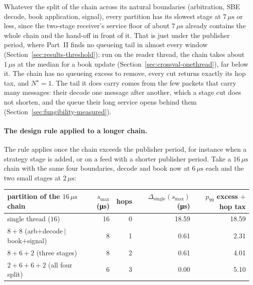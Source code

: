 \documentclass[11pt]{article}
\begin{document}
Whatever the split of the chain across its natural boundaries (arbitration, SBE decode,
book application, signal), every partition has its slowest stage at $7\,\mu\mathrm{s}$ or
less, since the two-stage receiver's service floor of about $7\,\mu\mathrm{s}$ already
contains the whole chain and the hand-off in front of it. That is just under the publisher
period, where Part~II finds no queueing tail in almost every window
(Section~\ref{sec:results-threshold}); run on the reader thread, the chain takes about
$1\,\mu\mathrm{s}$ at the median for a book update (Section~\ref{sec:crossval-onethread}),
far below it. The chain has
no queueing excess to remove, every cut returns exactly its hop tax, and $N^\star = 1$.
The tail it does carry comes from the few packets that carry many messages: their decode
one message after another, which a stage cut does not shorten, and the queue their long
service opens behind them (Section~\ref{sec:fungibility-measured}).

\paragraph{The design rule applied to a longer chain.} The rule applies once the chain
exceeds the publisher period, for instance when a strategy stage is added, or on a feed with a shorter
publisher period. Take a
$16\,\mu\mathrm{s}$ chain with the same four boundaries, decode and book now at
$6\,\mu\mathrm{s}$ each and the two small stages at $2\,\mu\mathrm{s}$:

\begin{center}
\begin{tabular}{@{}lrrrr@{}}
\toprule
partition of the $16\,\mu\mathrm{s}$ chain & $s_{\max}$ (\si{\micro\second}) & hops & $\Delta_{\mathrm{single}}(s_{\max})$ (\si{\micro\second}) & $p_{99}$ excess $+$ hop tax \\
\midrule
single thread ($16$)                        & 16 & 0 & 18.59 & 18.59 \\
$8 + 8$ (arb$+$decode\,$|$\,book$+$signal)  &  8 & 1 &  0.61 &  2.31 \\
$8 + 6 + 2$ (three stages)                  &  8 & 2 &  0.61 &  4.01 \\
$2 + 6 + 6 + 2$ (all four split)            &  6 & 3 &  0.00 &  5.10 \\
\bottomrule
\end{tabular}
\end{center}
\end{document}
